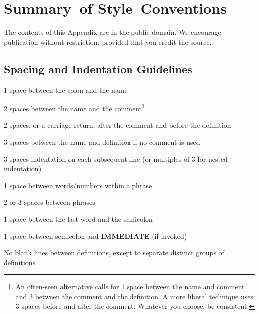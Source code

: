 \chapter{Summary~of
Style~Conventions}
The contents of this Appendix are in the public domain. We encourage
publication without restriction, provided that you credit the source.

\section{Spacing and Indentation Guidelines}
\begin{list}
{}{\setlength{\parsep}{0cm}}
\item 1 space between the colon and the name
\item 2 spaces between the name and the comment\footnote{
An often-seen alternative calls for 1 space between the name and comment and 3 between
the comment and the definition. A more liberal technique uses 3 spaces before and after the
comment. Whatever you choose, be consistent.
}
\item 2 spaces, or a carriage return, after the comment and before the definition\footnotemark[1]
\item 3 spaces between the name and definition if no comment is used
\item 3 spaces indentation on each subsequent line (or multiples of 3 for nested indentation)
\item 1 space between words/numbers within a phrase
\item 2 or 3 spaces between phrases
\item 1 space between the last word and the semicolon
\item 1 space between semicolon and {\bf IMMEDIATE} (if invoked)
\end{list}
No blank lines between definitions, except to separate distinct groups of
definitions

